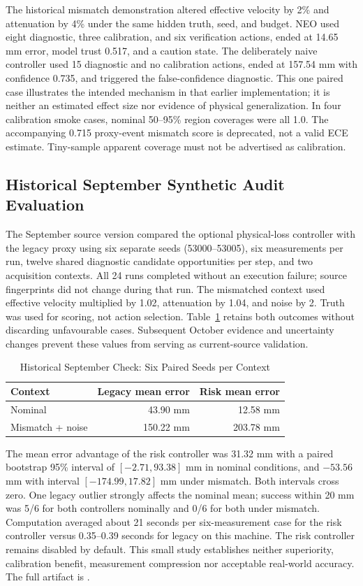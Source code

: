 \documentclass[conference]{IEEEtran}
\begin{document}
The historical mismatch demonstration altered effective velocity by 2\% and attenuation by 4\% under the same hidden truth, seed, and budget. NEO used eight diagnostic, three calibration, and six verification actions, ended at 14.65 mm error, model trust 0.517, and a caution state. The deliberately naive controller used 15 diagnostic and no calibration actions, ended at 157.54 mm with confidence 0.735, and triggered the false-confidence diagnostic. This one paired case illustrates the intended mechanism in that earlier implementation; it is neither an estimated effect size nor evidence of physical generalization. In four calibration smoke cases, nominal 50--95\% region coverages were all 1.0. The accompanying 0.715 proxy-event mismatch score is deprecated, not a valid ECE estimate. Tiny-sample apparent coverage must not be advertised as calibration.

\subsection{Historical September Synthetic Audit Evaluation}
The September source version compared the optional physical-loss controller with the legacy proxy using six separate seeds (53000--53005), six measurements per run, twelve shared diagnostic candidate opportunities per step, and two acquisition contexts. All 24 runs completed without an execution failure; source fingerprints did not change during that run. The mismatched context used effective velocity multiplied by 1.02, attenuation by 1.04, and noise by 2. Truth was used for scoring, not action selection. Table~\ref{tab:current-risk} retains both outcomes without discarding unfavourable cases. Subsequent October evidence and uncertainty changes prevent these values from serving as current-source validation.

\begin{table}[t]
\caption{Historical September Check: Six Paired Seeds per Context}
\label{tab:current-risk}
\centering\small
\begin{tabular}{@{}lrr@{}}
\toprule
Context & Legacy mean error & Risk mean error \\
\midrule
Nominal & 43.90 mm & 12.58 mm \\
Mismatch + noise & 150.22 mm & 203.78 mm \\
\bottomrule
\end{tabular}
\end{table}

The mean error advantage of the risk controller was 31.32 mm with a paired bootstrap 95\% interval of $[-2.71,93.38]$ mm in nominal conditions, and $-53.56$ mm with interval $[-174.99,17.82]$ mm under mismatch. Both intervals cross zero. One legacy outlier strongly affects the nominal mean; success within 20 mm was 5/6 for both controllers nominally and 0/6 for both under mismatch. Computation averaged about 21 seconds per six-measurement case for the risk controller versus 0.35--0.39 seconds for legacy on this machine. The risk controller remains disabled by default. This small study establishes neither superiority, calibration benefit, measurement compression nor acceptable real-world accuracy. The full artifact is .
\end{document}
